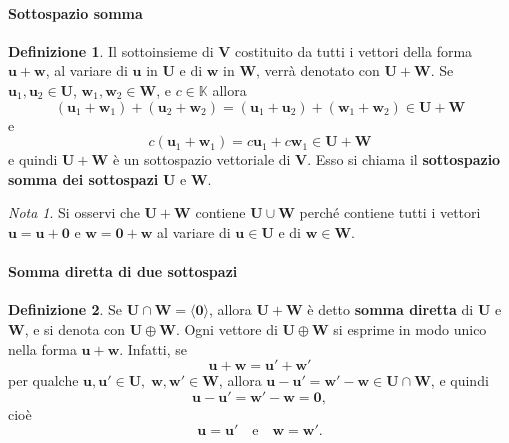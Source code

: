 \documentclass{article}
\theoremstyle{plain}
\theoremstyle{definition}
\newtheorem{defn}{Definizione}[section]
\theoremstyle{remark}
\newtheorem{note}{Nota}
\begin{document}
\paragraph{Sottospazio somma}
\begin{bxthm}
\begin{defn}
    Il sottoinsieme di \(\mathbf{V}\) costituito da tutti i vettori della forma \(\mathbf{u} + \mathbf{w}\), al variare di \(\mathbf{u}\) in \(\mathbf{U}\) e di \(\mathbf{w}\) in \(\mathbf{W}\), verrà denotato con \(\mathbf{U} + \mathbf{W}\).
    Se \(\mathbf{u}_1, \mathbf{u}_2 \in \mathbf{U}\), \(\mathbf{w}_1, \mathbf{w}_2 \in \mathbf{W}\), e \(c \in \mathbb{K}\) allora
    \[
        (\mathbf{u}_1 + \mathbf{w}_1) + (\mathbf{u}_2 + \mathbf{w}_2) = (\mathbf{u}_1 + \mathbf{u}_2) + (\mathbf{w}_1 + \mathbf{w}_2) \in \mathbf{U} + \mathbf{W}
    \]
    e
    \[
        c(\mathbf{u}_1 + \mathbf{w}_1) = c \mathbf{u}_1 + c \mathbf{w}_1 \in \mathbf{U} + \mathbf{W}
    \]
    e quindi \( \mathbf{U} + \mathbf{W} \) è un sottospazio vettoriale di \( \mathbf{V} \). 
    Esso si chiama il \textbf{sottospazio somma dei sottospazi} \( \mathbf{U} \) e \( \mathbf{W} \).
\end{defn}
\end{bxthm}

\vspace{10pt}

\begin{note}
    Si osservi che \( \mathbf{U} + \mathbf{W} \) contiene \( \mathbf{U} \cup \mathbf{W} \) perché contiene tutti i vettori \( \mathbf{u} = \mathbf{u} + \mathbf{0} \) e \( \mathbf{w} = \mathbf{0} + \mathbf{w} \) al variare di \( \mathbf{u} \in \mathbf{U} \) e di \( \mathbf{w} \in \mathbf{W} \).\\
\end{note}

\vspace{10pt}

\paragraph{Somma diretta di due sottospazi}
\begin{bxthm}
\begin{defn}
    Se \( \mathbf{U} \cap \mathbf{W} = \langle \mathbf{0}\rangle \), allora \( \mathbf{U} + \mathbf{W} \) è detto \textbf{somma diretta} di \( \mathbf{U} \) e \( \mathbf{W} \), e si denota con \( \mathbf{U} \oplus \mathbf{W} \).
    Ogni vettore di \( \mathbf{U} \oplus \mathbf{W} \) si esprime in modo unico nella forma \( \mathbf{u} + \mathbf{w} \).
    Infatti, se
    \[
        \mathbf{u} + \mathbf{w} = \mathbf{u}' + \mathbf{w}'
    \]
    per qualche \( \mathbf{u}, \mathbf{u}' \in \mathbf{U} ,\; \mathbf{w}, \mathbf{w}' \in \mathbf{W} \), allora \( \mathbf{u} - \mathbf{u}' = \mathbf{w}' - \mathbf{w} \in \mathbf{U} \cap \mathbf{W} \), e quindi
    \[ 
        \mathbf{u} - \mathbf{u}' = \mathbf{w}' - \mathbf{w} = \mathbf{0},
    \]
    cioè
    \[ 
        \mathbf{u} = \mathbf{u}' \quad\text{e}\quad \mathbf{w} = \mathbf{w}'.
    \]
\end{defn}
\end{bxthm}
\end{document}
